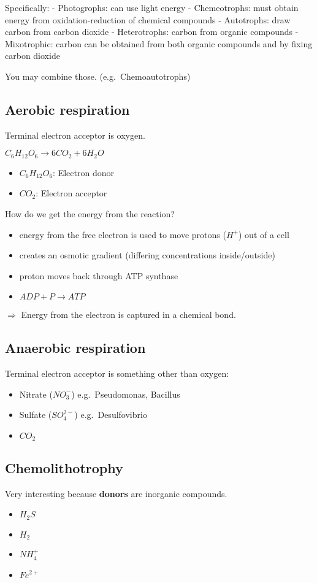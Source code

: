 Specifically: - Photogrophs: can use light energy - Chemeotrophs: must
obtain energy from oxidation-reduction of chemical compounds -
Autotrophs: draw carbon from carbon dioxide - Heterotrophs: carbon from
organic compounds - Mixotrophic: carbon can be obtained from both
organic compounds and by fixing carbon dioxide

You may combine those. (e.g.~Chemoautotrophs)

\hypertarget{aerobic-respiration}{%
\subsection{Aerobic respiration}\label{aerobic-respiration}}

Terminal electron acceptor is oxygen.

\(C_6 H_12 O_6 \rightarrow 6 CO_2 + 6 H_2 O\)

\begin{itemize}
\tightlist
\item
  \(C_6 H_12 O_6\): Electron donor
\item
  \(CO_2\): Electron acceptor
\end{itemize}

How do we get the energy from the reaction?

\begin{itemize}
\tightlist
\item
  energy from the free electron is used to move protons (\(H^+\)) out of
  a cell
\item
  creates an osmotic gradient (differing concentrations inside/outside)
\item
  proton moves back through ATP synthase
\item
  \(ADP + P \rightarrow ATP\)
\end{itemize}

\(\Rightarrow\) Energy from the electron is captured in a chemical bond.

\hypertarget{anaerobic-respiration}{%
\subsection{Anaerobic respiration}\label{anaerobic-respiration}}

Terminal electron acceptor is something other than oxygen:

\begin{itemize}
\tightlist
\item
  Nitrate (\(NO_3^-\)) e.g.~Pseudomonas, Bacillus
\item
  Sulfate (\(SO_4^{2-}\)) e.g.~Desulfovibrio
\item
  \(CO_2\)
\end{itemize}

\hypertarget{chemolithotrophy}{%
\subsection{Chemolithotrophy}\label{chemolithotrophy}}

Very interesting because \textbf{donors} are inorganic compounds.

\begin{itemize}
\tightlist
\item
  \(H_2 S\)
\item
  \(H_2\)
\item
  \(NH_4^+\)
\item
  \(Fe^{2+}\)
\end{itemize}
